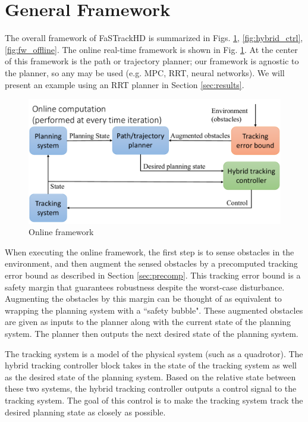 \section{General Framework \label{sec:framework}}
The overall framework of FaSTrackHD is summarized in Figs. \ref{fig:fw_online}, \ref{fig:hybrid_ctrl}, \ref{fig:fw_offline}. The online real-time framework is shown in Fig. \ref{fig:fw_online}. At the center of this framework is the path or trajectory planner; our framework is agnostic to the planner, so any may be used (e.g. MPC, RRT, neural networks). We will present an example using an RRT planner in Section \ref{sec:results}.
\begin{figure}[h!]
  \centering
	\includegraphics[width=1\columnwidth]{fig/framework_online}
	\caption{Online framework}
	\label{fig:fw_online}
	\vspace{-.1in}
\end{figure}

When executing the online framework, the first step is to sense obstacles in the environment, and then augment the sensed obstacles by a precomputed tracking error bound as described in Section \ref{sec:precomp}. This tracking error bound is a safety margin that guarantees robustness despite the worst-case disturbance. Augmenting the obstacles by this margin can be thought of as equivalent to wrapping the planning system with a ``safety bubble". These augmented obstacles are given as inputs to the planner along with the current state of the planning system. The planner then outputs the next desired state of the planning system. 

The tracking system is a model of the physical system (such as a quadrotor). The hybrid tracking controller block takes in the state of the tracking system as well as the desired state of the planning system. Based on the relative state between these two systems, the hybrid tracking controller outputs a control signal to the tracking system. The goal of this control is to make the tracking system track the desired planning state as closely as possible.

